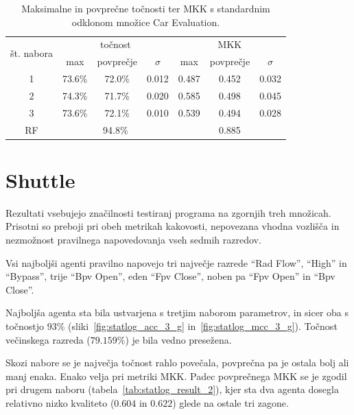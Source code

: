 \documentclass[a4paper,12pt,openright]{book}
\begin{document}
    \begin{table}[H]
        \begin{center}
            \begin{tabular}{|| c | c c c || c c c ||}
                \hline
                \multirow{2}{*}{št. nabora} & \multicolumn{3}{c||}{točnost} & \multicolumn{3}{c||}{MKK} \\ \cline{2-7}
                & max    & povprečje & $\sigma$ & max   & povprečje & $\sigma$ \\
                \hline
                1 & 73.6\% & 72.0\%    & 0.012    & 0.487 & 0.452     & 0.032    \\
                2 & 74.3\% & 71.7\%    & 0.020    & 0.585 & 0.498     & 0.045    \\
                3 & 73.6\% & 72.1\%    & 0.010    & 0.539 & 0.494     & 0.028    \\ \hline
                RF & \multicolumn{3}{c||}{94.8\%} & \multicolumn{3}{c||}{0.885} \\
                \hline
            \end{tabular}
        \end{center}
        \caption{Maksimalne in povprečne točnosti ter MKK s standardnim odklonom množice Car Evaluation.}
        \label{tab:car_result_aggregate}
    \end{table}

    \section{Shuttle}\label{sec:rezultati-shuttle}
    Rezultati vsebujejo značilnosti testiranj programa na zgornjih treh množicah.
    Prisotni so preboji pri obeh metrikah kakovosti, nepovezana vhodna vozlišča in nezmožnost pravilnega napovedovanja vseh sedmih
    razredov.

    Vsi najboljši agenti pravilno napovejo tri največje razrede \enquote{Rad Flow}, \enquote{High} in \enquote{Bypass}, trije
    \enquote{Bpv Open}, eden \enquote{Fpv Close}, noben pa \enquote{Fpv Open} in \enquote{Bpv Close}.

    Najboljša agenta sta bila ustvarjena s tretjim naborom parametrov, in sicer oba s točnostjo $93\%$ (sliki~\ref{fig:statlog_acc_3_g} in~\ref{fig:statlog_mcc_3_g}).
    Točnost večinskega razreda ($79.159\%$) je bila vedno presežena.

    Skozi nabore se je največja točnost rahlo povečala, povprečna pa je ostala bolj ali manj enaka.
    Enako velja pri metriki MKK.
    Padec povprečnega MKK se je zgodil pri drugem naboru (tabela~\ref{tab:statlog_result_2}), kjer sta dva agenta dosegla relativno nizko kvaliteto ($0.604$ in $0.622$)
    glede na ostale tri zagone.
\end{document}
